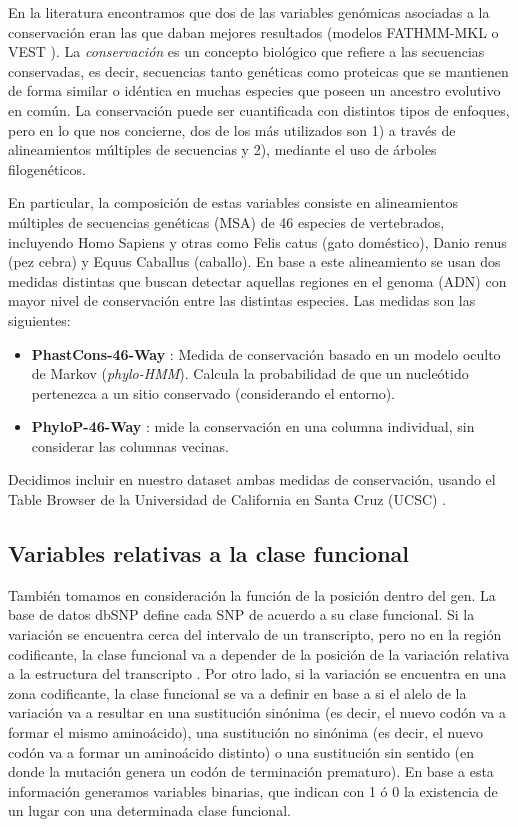 En la literatura encontramos que dos de las variables genómicas asociadas a la conservación eran las que daban mejores resultados (modelos FATHMM-MKL \cite{Shihab2015} o VEST \cite{Carter2013}). La \textit{conservación} es un concepto biológico que refiere a las secuencias conservadas, es decir, secuencias tanto genéticas como proteicas que se mantienen de forma similar o idéntica en muchas especies que poseen un ancestro evolutivo en común. La conservación puede ser cuantificada con distintos tipos de enfoques, pero en lo que nos concierne, dos de los más utilizados son 1) a través de alineamientos múltiples de secuencias y 2), mediante el uso de árboles filogenéticos.

En particular, la composición de estas variables consiste en alineamientos múltiples de secuencias genéticas (MSA) de 46 especies de vertebrados, incluyendo Homo Sapiens y otras como Felis catus (gato doméstico), Danio renus (pez cebra) y Equus Caballus (caballo). En base a este alineamiento se usan dos medidas distintas que buscan detectar aquellas regiones en el genoma (ADN) con mayor nivel de conservación entre las distintas especies. Las medidas son las siguientes:
\begin{itemize}
    \item \textbf{PhastCons-46-Way} \cite{siepel2005evolutionarily}: Medida de conservación basado en un modelo oculto de Markov (\textit{phylo-HMM}). Calcula la probabilidad de que un nucleótido pertenezca a un sitio conservado (considerando el entorno).
    \item \textbf{PhyloP-46-Way} \cite{Pollard2010}: mide la conservación en una columna individual, sin considerar las columnas vecinas.
\end{itemize}

Decidimos incluir en nuestro dataset ambas medidas de conservación, usando el Table Browser de la Universidad de California en Santa Cruz (UCSC) \cite{Karolchik2004}.

\subsection{Variables relativas a la clase funcional}

También tomamos en consideración la función de la posición dentro del gen. La base de datos dbSNP define cada SNP de acuerdo a su clase funcional. Si la variación se encuentra cerca del intervalo de un transcripto, pero no en la región codificante, la clase funcional va a depender de la posición de la variación relativa a la estructura del transcripto \cite{Ostell2007}.  Por otro lado, si la variación se encuentra en una zona codificante, la clase funcional se va a definir en base a si el alelo de la variación va a resultar en una sustitución sinónima (es decir, el nuevo codón va a formar el mismo aminoácido), una sustitución no sinónima (es decir, el nuevo codón va a formar un aminoácido distinto) o una sustitución sin sentido (en donde la mutación genera un codón de terminación prematuro). En base a esta información generamos variables binarias, que indican con 1 ó 0 la existencia de un lugar con una determinada clase funcional.


